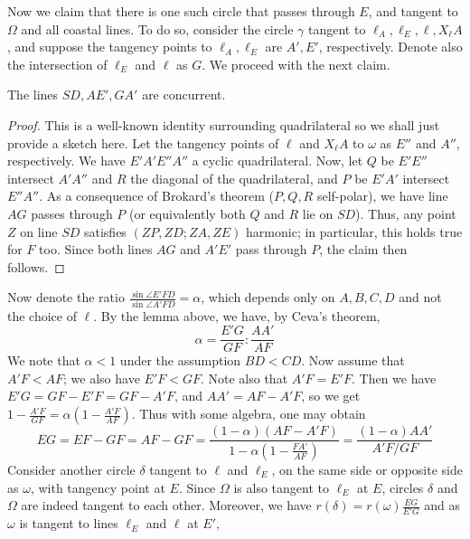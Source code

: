 \documentclass[11pt,a4paper]{article}
\begin{document}
\begin{enumerate}
        Now we claim that there is one such circle that passes through $E$, and tangent to $\Omega$ and all coastal lines. 
        To do so, consider the circle $\gamma$ tangent to $\ell_A, \ell_E, \ell, X_{\ell}A$, 
        and suppose the tangency points to $\ell_A, \ell_E$ are $A', E'$, respectively. 
        Denote also the intersection of $\ell_E$ and $\ell$ as $G$. 
        We proceed with the next claim. 
        \begin{lemma}
        	The lines $SD, AE', GA'$ are concurrent.
        \end{lemma}
        \begin{proof}
        	This is a well-known identity surrounding quadrilateral so we shall just provide a sketch here. 
        	Let the tangency points of $\ell$ and $X_{\ell}A$ to $\omega$ as $E''$ and $A''$, respectively. 
        	We have $E'A'E''A''$ a cyclic quadrilateral. 
        	Now, let $Q$ be $E'E''$ intersect $A'A''$ and $R$ the diagonal of the quadrilateral, 
        	and $P$ be $E'A'$ intersect $E''A''$. 
        	As a consequence of Brokard's theorem ($P, Q, R$ self-polar), we have line $AG$ passes through $P$ 
        	(or equivalently both $Q$ and $R$ lie on $SD$). 
        	Thus, any point $Z$ on line $SD$ satisfies $(ZP, ZD; ZA, ZE)$ harmonic; 
        	in particular, this holds true for $F$ too. Since both lines $AG$ and $A'E'$ pass through $P$, 
        	the claim then follows. 
        \end{proof}
        Now denote the ratio $\frac{\sin\angle E'FD}{\sin\angle A'FD}=\alpha$, which depends only on $A, B, C, D$ and not the choice of $\ell$. 
        By the lemma above, we have, by Ceva's theorem, 
        \[
        \alpha = \frac{E'G}{GF}: \frac{AA'}{AF}
        \]
        We note that $\alpha < 1$ under the assumption $BD < CD$. 
        Now assume that $A'F < AF$; we also have $E'F < GF$. 
        Note also that $A'F = E'F$. Then we have $E'G = GF - E'F = GF - A'F$, 
        and $AA' = AF - A'F$, so we get $1 - \frac{A'F}{GF} = \alpha(1 - \frac{A'F}{AF})$. 
        Thus with some algebra, one may obtain 
        \[
        EG=EF-GF=AF-GF = \frac{(1-\alpha)(AF - A'F)}{1 - \alpha (1- \frac{FA'}{AF})}= \frac{(1-\alpha)AA'}{A'F/GF}
        \]
        Consider another circle $\delta$ tangent to $\ell$ and $\ell_E$, on the same side or opposite side as $\omega$, 
        with tangency point at $E$. Since $\Omega$ is also tangent to $\ell_E$ at $E$, 
        circles $\delta$ and $\Omega$ are indeed tangent to each other. 
        Moreover, we have $r(\delta) = r(\omega)\frac{EG}{E'G}$ and as $\omega$ is tangent to lines $\ell_E$ and $\ell$ at $E'$, 

\end{enumerate}
\end{document}
